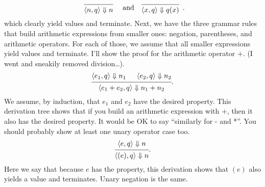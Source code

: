 \documentclass[11pt]{article}
\begin{document}
\[
\begin{array}{ccc}
  \begin{prooftree}
  \infer0{\langle n, q \rangle \Downarrow n},
\end{prooftree} & \textrm{ and~~ }
\begin{prooftree}
  \infer0{\langle x, q \rangle \Downarrow q(x)}
\end{prooftree}
\end{array}.
\]
which clearly yield values and terminate. Next, we have the three grammar rules
that build arithmetic expressions from smaller ones: negation, parentheses, and arithmetic operators.
For each of those, we assume that all smaller expressions yield values and terminate. I'll show the
proof for the arithmetic operator $+$. (I went and sneakily removed division\ldots).
\[
  \begin{prooftree}
    \hypo{\langle e_1, q \rangle \Downarrow n_1}
    \hypo{\langle e_2, q \rangle \Downarrow n_2}
  \infer2{\langle e_1 + e_2, q \rangle \Downarrow n_1 + n_2}
  \end{prooftree}
  .
\]
We assume, by induction, that $e_1$ and $e_2$ have the desired property. This derivation tree shows that if you build
an arithmetic expression with $+$, then it also has the desired property. It would be OK to say ``similarly for
- and *''. You should probably show at least one unary operator case too.
\[
  \begin{prooftree}
    \hypo{\langle e, q \rangle \Downarrow n}
  \infer1{\langle (e), q \rangle \Downarrow n},
  \end{prooftree}
  .
\]
Here we say that because $e$ has the property, this derivation shows that $(e)$ also yields a value and terminates.
Unary negation is the same.
\end{document}

